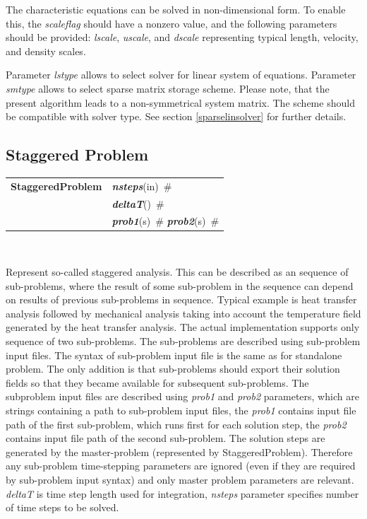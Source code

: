 \documentclass[a4paper]{article}
\makeatletter
\newcommand{\param}[1]{{\em #1}}
\newcommand{\keywordnotype}[1]{\mbox{{\it{\bf{#1}}}}}
\newcommand{\keyword}[2]{\mbox{{\keywordnotype{#1}\tiny (#2)}}}
\newcommand{\entKeywordInst}[1]{\mbox{{\bf{{#1}}}}}
\newcommand{\field}[2]{\mbox{\keyword{#1}{#2}~\#}}
\newenvironment{record}[1][]{\begin{tabular}{|ll}}{\end{tabular}\\}
\newcommand{\recentry}[2]{{#1}&{#2}\\}
\newcounter{rcc}
\newenvironment{record}[1][\textwidth]{\setcounter{rcc}{0}\begin{tabular*}{#1}{|ll@{\extracolsep{\fill}}r}}{\end{tabular*}\\}
\newcommand{\recentry}[2]{\ifthenelse{\value{rcc}>0}{&$\backslash$ \\}{\setcounter{rcc}{1}}{#1}&{#2}}
\makeatother
\begin{document}
The characteristic equations can be solved in non-dimensional form. To
enable this, the \param{scaleflag} should have a nonzero value,
and the following parameters should be provided: \param{lscale},
\param{uscale}, and \param{dscale} representing typical length,
velocity, and density scales. 

Parameter \param{lstype} allows to select solver for linear system of
equations. Parameter \param{smtype} allows to select sparse matrix storage
scheme. Please note, that the present algorithm leads to a
non-symmetrical system
matrix. The scheme should be compatible with solver type. See section
\ref{sparselinsolver} for further details.

\subsection{Staggered Problem}
\label{staggeredproblem}
\begin{record}
\recentry{\entKeywordInst{StaggeredProblem}}{\field{nsteps}{in}}
\recentry{}{\field{deltaT}{}} \recentry{}{\field{prob1}{s} \field{prob2}{s}}
\end{record}

Represent so-called staggered analysis. This can be described as an
sequence of sub-problems, where the result of some sub-problem in the
sequence can depend on results of previous sub-problems in sequence.
Typical example is heat transfer analysis followed by mechanical
analysis taking into account the temperature field generated by the
heat transfer analysis.
The actual implementation supports only sequence of two sub-problems.
The sub-problems are described using sub-problem input files. The
syntax of sub-problem input file is the same as for standalone
problem. The only addition is that sub-problems should export their
solution fields so that they became available for subsequent
sub-problems. The subproblem input files are described using
\param{prob1} and \param{prob2} parameters, which are strings
containing a path to sub-problem input files, the \param{prob1}
contains input file path of the first sub-problem, which runs first
for each solution step, the \param{prob2} contains input file path of
the second sub-problem. The solution steps are generated by the
master-problem (represented by StaggeredProblem). Therefore any
sub-problem time-stepping parameters are ignored (even if they are
required by sub-problem input syntax) and only master problem
parameters are relevant. \param{deltaT} is time step length used for
integration, \param{nsteps} parameter specifies
number of time steps to be solved.
\end{document}
